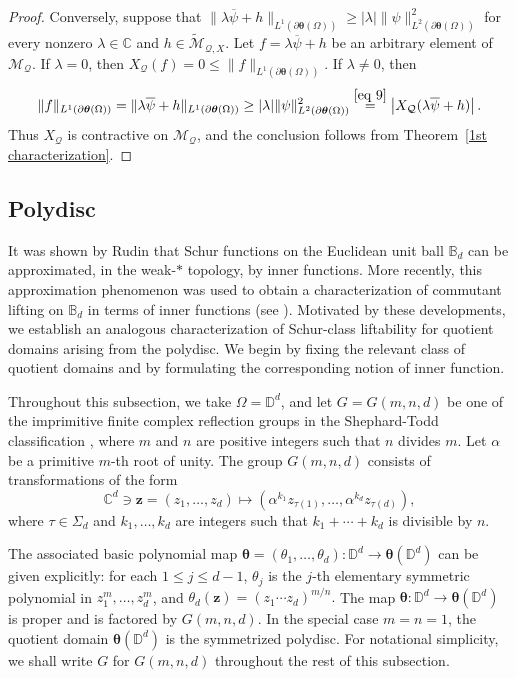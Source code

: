 \documentclass[12pt,reqno]{amsart}
\theoremstyle{remark}
\theoremstyle{definition}
\def \z{\boldsymbol{z}}
\begin{document}
\begin{proof}
Conversely, suppose that $\|\lambda\overline{\psi}+h\|_{L^1(\partial\boldsymbol\theta(\Omega))} \geq |\lambda|\|\psi\|^2_{L^2(\partial\boldsymbol\theta(\Omega))}$ for every nonzero $\lambda \in \mathbb C$ and $h\in \widetilde{\mathcal{M}}_{\mathcal{Q}, X}.$
Let $f = \lambda \overline{\psi} + h$ be an arbitrary element of $\mathcal{M}_{\mathcal{Q}}$. If $\lambda=0$, then $X_{\mathcal{Q}}(f) = 0 \leq \|f\|_{L^1(\partial\boldsymbol\theta(\Omega))}$. If $\lambda \neq 0$, then
$$ \|f\|_{L^1(\partial\boldsymbol\theta(\Omega))} = \|\lambda \overline{\psi} + h\|_{L^1(\partial\boldsymbol\theta(\Omega))} \geq |\lambda| \|\psi\|^2_{L^2(\partial\boldsymbol\theta(\Omega))}\overset{\eqref{eq 9}}{=} \left|X_{\mathcal{Q}}(\lambda \overline{\psi}+h)\right|.$$
Thus $X_{\mathcal Q}$ is contractive on $\mathcal{M}_{\mathcal Q}$,  and the conclusion follows from Theorem~\ref{1st characterization}.
\end{proof}


\subsection{Polydisc}
It was shown by Rudin \cite{Rd1983} that Schur functions on the Euclidean unit ball $\mathbb B_d$ can be approximated, in the weak-$*$ topology, by inner functions. More recently, this approximation phenomenon was used to obtain a characterization of commutant lifting on $\mathbb B_d$ in terms of inner functions (see \cite{BDS2025}). Motivated by these developments, we establish an analogous characterization of Schur-class liftability for quotient domains arising from the polydisc. We begin by fixing the relevant class of quotient domains and by formulating the corresponding notion of inner function.


Throughout this subsection, we take $\Omega=\mathbb D^d$, and let $G=G(m,n,d)$ be one of the imprimitive finite complex reflection groups in the Shephard-Todd classification \cite{ST1954}, where $m$ and $n$ are positive integers such that $n$ divides $m$. Let $\alpha$ be a primitive $m$-th  root of unity. The group $G(m,n,d)$ consists of transformations of the form 
$$\mathbb C^d \ni \z=(z_1,\ldots,z_d)\longmapsto (\alpha^{k_1} z_{\tau(1)}, \ldots, \alpha^{k_d} z_{\tau(d)}),$$ where $\tau\in \Sigma_d$ and $k_1,\ldots, k_d$ are integers such that $k_1+\cdots+k_d$ is divisible by $n.$

The associated basic polynomial map $\boldsymbol\theta=(\theta_1,\ldots,\theta_d):\mathbb D^d\to \boldsymbol \theta(\mathbb D^d)$ can be given explicitly: for each $1\leq j\leq d-1$, $\theta_j$ is the $j$-th elementary symmetric polynomial in $z_1^m,\ldots,z_d^m$, and $\theta_d(\boldsymbol z)=(z_1\cdots z_d)^{m/n}.$ 
The map $\boldsymbol\theta:\mathbb D^d\longrightarrow \boldsymbol\theta(\mathbb D^d)$ is proper and is factored by $G(m,n,d)$. In the special case $m=n=1$, the quotient domain $\boldsymbol\theta(\mathbb D^d)$ is the symmetrized polydisc. For notational simplicity, we shall write \(G\) for \(G(m,n,d)\) throughout the rest of this subsection.
\end{document}
